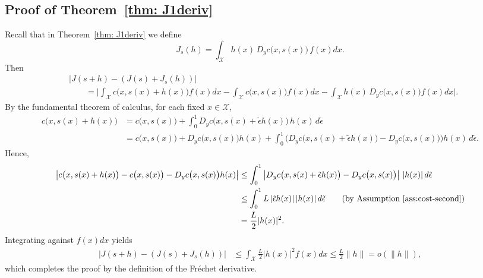 \documentclass[12pt,leqno]{amsart}
\begin{document}
\subsection{Proof of Theorem~\ref{thm: J1deriv}}
Recall that in Theorem~\ref{thm: J1deriv} we define
\[
J_s(h)=\int_{\mathcal{X}} h(x)\,D_y c\big(x,s(x)\big)\,f(x)dx .
\]
Then
\begin{align*}
    &\left|J(s+h)-(J(s)+J_s(h))\right|\\
    &\quad\quad=\Bigg|\int_{\mathcal{X}} c\big(x,s(x)+h(x)\big)f(x)dx
          -\int_{\mathcal{X}} c\big(x,s(x)\big)f(x)dx
          -\int_{\mathcal{X}} h(x)\,D_y c\big(x,s(x)\big)f(x)dx\Bigg|.
\end{align*}
By the fundamental theorem of calculus, for each fixed $x\in\mathcal{X}$,
\begin{align*}
c\big(x,s(x)+h(x)\big)
&=c\big(x,s(x)\big)+\int_0^1 D_y c\big(x,s(x)+\tilde{\epsilon} h(x)\big)\,h(x)\,d\tilde{\epsilon}\\
&=c\big(x,s(x)\big)+D_y c\big(x,s(x)\big)h(x)
    +\int_0^1\!\Big(D_y c\big(x,s(x)+\tilde{\epsilon} h(x)\big)-D_y c\big(x,s(x)\big)\Big)h(x)\,d\tilde{\epsilon} .
\end{align*}
Hence,
\begin{align*}
\left|c\big(x,s(x)+h(x)\big)-c\big(x,s(x)\big)-D_y c\big(x,s(x)\big)h(x)\right|
&\le \int_0^1 \left|D_y c\big(x,s(x)+\tilde{\epsilon} h(x)\big)-D_y c\big(x,s(x)\big)\right|\,|h(x)|\,d\tilde{\epsilon}\\
&\le \int_0^1 L\,|\tilde{\epsilon} h(x)|\,|h(x)|\,d\tilde{\epsilon} \qquad \text{(by Assumption~\ref{ass:cost-second})}\\
&=\frac{L}{2}|h(x)|^2 .
\end{align*}
Integrating against $f(x)dx$ yields
\begin{align*}
    \left|J(s+h)-(J(s)+J_s(h))\right|
    &\le \int_{\mathcal{X}}\frac{L}{2}|h(x)|^2 f(x)dx
    \le \frac{L}{2}\|h\|
    =o(\|h\|),
\end{align*}
which completes the proof by the definition of the Fr\'echet derivative.
\end{document}
